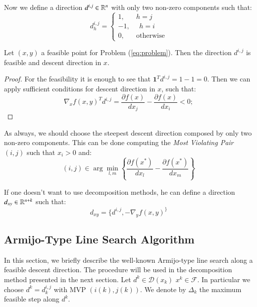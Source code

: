 Now we define a direction $d^{i,j} \in \mathbb{R}^n$ with only two non-zero components such that:
\begin{equation}\label{eq:direction}
d_h^{i,j}= 
\begin{cases}
1, \quad \text{    } h=j\\
-1, \text{    } \text{    } h=i\\
0, \quad \text{    } \text{otherwise}
\end{cases}
\end{equation}

\begin{proposition}
Let $(x,y)$ a feasible point for Problem (\ref{eq:problem}). Then the direction $d^{i,j}$ is  feasible and descent direction in $x$.
\end{proposition}
\begin{proof}
For the feasibility it is enough to see that $\mathbf{1}^Td^{i,j}=1-1=0$.
Then we can apply sufficient conditions for descent direction in $x$, such that:
\begin{equation*}
 \nabla_xf(x,y)^Td^{i,j} =  \frac{\partial f(x)}{dx_j} - \frac{\partial f(x)}{dx_i}<0; 
\end{equation*}
\end{proof}

As always, we should choose the steepest descent direction composed by only two non-zero components.
This can be done computing the \emph{Most Violating Pair} $(i,j)$ such that $x_i>0$ and:
\begin{equation}
 (i,j) \in \arg \min_{l,m} \left\{\frac{\partial f(x^*)}{dx_l} - \frac{\partial f(x^*)}{dx_m}  \right\}
\end{equation}

If one doesn't want to use decomposition methods, he can define a direction $d_{xy} \in \mathbb{R}^{n+k}$ such that:
\begin{equation}
 d_{xy}=\{d^{i,j},-\nabla_yf(x,y)^
 \}
\end{equation}

\subsection{Armijo-Type Line Search Algorithm}
In this section, we briefly describe the well-known Armijo-type line search along a feasible descent direction. The procedure will be used in the decomposition method presented in the next section. 
Let $d^{k} \in \mathcal{D}(x_k)$  $x^{k} \in \mathcal{F}$. In particular we choose $d^{k}=d^{i,j}_k$ with MVP $(i(k),j(k))$.
We denote by $\Delta_{k}$ the maximum feasible step along $d^{k}$. 

